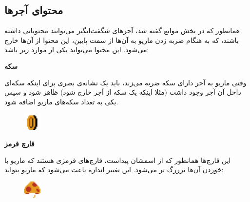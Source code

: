\documentclass{utap}
\begin{document}
	\subsection{محتوای آجرها}
همانطور که در بخش موانع گفته شد، آجر‌های شگفت‌انگیز می‌توانند محتویاتی داشته باشند، که به هنگام ضربه زدن ماریو به آن‌ها از سمت پایین، این محتوا از آن‌ها خارج می‌شود. این محتوا می‌تواند یکی از موارد زیر باشد:
	\begin{itemize}
			\begin{minipage}{.75\textwidth}
		\item
				
\textbf{سکه}

وقتی ماریو به آجر دارای سکه ضربه می‌زند، باید یک نشانه‌ی بصری برای اینکه سکه‌ای داخل آن آجر وجود داشت (مثلا اینکه یک سکه از آجر خارج شود) ظاهر شود و سپس یکی به تعداد سکه‌های ماریو اضافه شود.
\end{minipage}
\begin{minipage}{.15\textwidth}
\begin{figure}[H]
	\begin{center}
		\includegraphics[width=0.9cm]{coin}
	\end{center}
\end{figure}
\end{minipage}

	\begin{minipage}{.75\textwidth}
		\item
\textbf{قارچ قرمز}

این قارچ‌ها همانطور که از اسمشان پیداست، قارچ‌های قرمزی هستند که ماریو با خوردن آن‌ها  برزرگ تر می‌شود. این تغییر اندازه باعث می‌شود که ماریو بتواند:

\end{minipage}
\begin{minipage}{.15\textwidth}
	\begin{figure}[H]
		\begin{center}
			\includegraphics[width=0.9cm]{red}
		\end{center}
	\end{figure}
\end{minipage}


\end{itemize}
\end{document}
